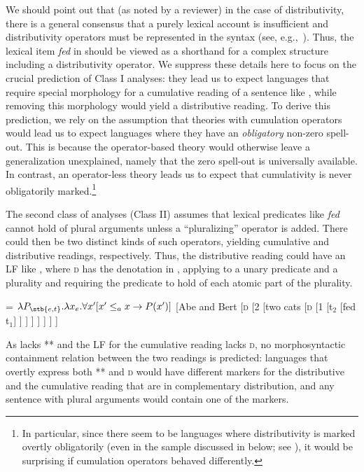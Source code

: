 \documentclass[output=paper]{langscibook}
\begin{document}
\noindent We should point out that (as noted by a reviewer) in the case of distributivity, there is a general consensus that a purely lexical account is insufficient and distributivity operators must be represented in the syntax (see, e.g.,~\citealt{Champollion:2015b}). Thus, the lexical item \textit{fed} in  should be viewed as a shorthand for a complex structure including a distributivity operator. We suppress these details here to focus on the crucial prediction of Class I analyses: they lead us to expect languages that require special morphology for a cumulative reading of a sentence like , while removing this morphology would yield a distributive reading. To derive this prediction, we rely on the assumption that theories with cumulation operators would lead us to expect languages where they have an \textit{obligatory} non-zero spell-out. This is because the operator-based theory would otherwise leave a generalization unexplained, namely that the zero spell-out is universally available. In contrast, an operator-less theory leads us to expect that cumulativity is never obligatorily marked.\footnote{In particular, since there seem to be languages where distributivity is marked overtly obligatorily (even in the sample discussed in  below; see \citealt{Flor:2017b, Flor:2017}), it would be surprising if cumulation operators behaved differently.}

The second class of analyses (Class II) assumes that lexical predicates like \textit{fed} cannot hold of plural arguments unless a ``pluralizing'' operator is added. There could then be two distinct kinds of such operators, yielding cumulative and distributive readings, respectively. Thus, the distributive reading could have an LF like , where \textsc{d} has the denotation in , applying to a unary predicate and a plurality and requiring the predicate to hold of each atomic part of the plurality. 

\ea 
\ea \label{has-sch:14a}  = $\lambda P_{\stb{e, t}}.\lambda x_e.\forall x'[x' \leq_a x \rightarrow P(x')]$
\ex \label{has-sch:14b} {[Abe and Bert [\textsc{d} [2 [two cats [\textsc{d} [1 [t$_2$ [fed t$_1$] ] ] ] ] ] ] ]} \z\z

\noindent As  lacks ** and the LF for the cumulative reading lacks \textsc{d}, no morphosyntactic containment relation between the two readings is predicted: languages that overtly express both ** and \textsc{d} would have different markers for the distributive and the cumulative reading that are in complementary distribution, and any sentence with plural arguments would contain one of the markers.
\end{document}
